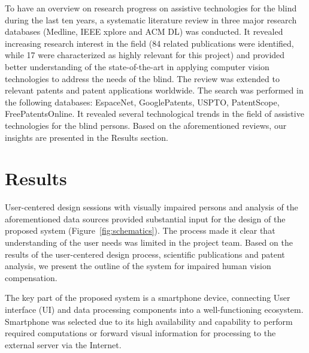 \documentclass[10pt,conference,compsocconf]{IEEEtran}
\begin{document}
To have an overview on research progress on assistive technologies for the blind during the last ten years, a systematic literature review in three major research databases (Medline, IEEE xplore and ACM DL) was conducted. It revealed increasing research interest in the field (84 related publications were identified, while 17 were characterized as highly relevant for this project) and provided better understanding of the state-of-the-art in applying computer vision technologies to address the needs of the blind. 
The review was extended to relevant patents and patent applications worldwide. The search was performed in the following databases: EspaceNet, GooglePatents, USPTO, PatentScope, FreePatentsOnline. It revealed several technological trends in the field of assistive technologies for the blind persons.
Based on the aforementioned reviews, our insights are presented in the Results section.




\section{Results}
\label{sec:results}

User-centered design sessions with visually impaired persons and analysis of the aforementioned data sources provided substantial input for the design of the proposed system (Figure~\ref{fig:schematics}). The process made it clear that understanding of the user needs was limited in the project team. Based on the results of the user-centered design process, scientific publications and patent analysis, we present the outline of the system for impaired human vision compensation. 

The key part of the proposed system is a smartphone device, connecting User interface (UI) and data processing components into a well-functioning ecosystem. Smartphone was selected due to its high availability and capability to perform required computations or forward visual information for processing to the external server via the Internet.
\end{document}
